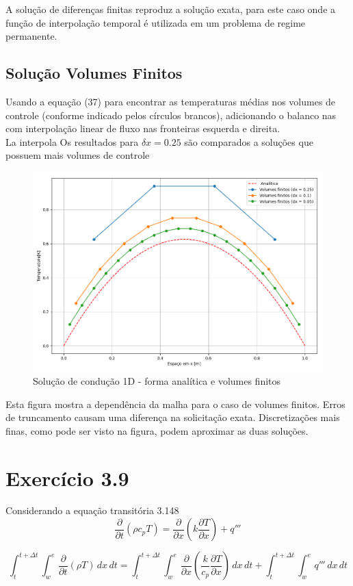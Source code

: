 \documentclass[]{article}
\begin{document}
A solução de diferenças finitas reproduz a solução exata, para este caso onde a função de interpolação temporal é utilizada em um problema de regime permanente.


\subsection*{Solução Volumes Finitos}

Usando a equação (37) para encontrar as temperaturas médias nos volumes de controle (conforme indicado pelos círculos brancos), adicionando o balanco nas com interpolação linear de fluxo nas fronteiras esquerda e direita.\\
La interpola
Os resultados para $\delta x = 0.25$ são comparados a soluções que possuem mais volumes de controle

\begin{figure}[H]
	\centering
	\includegraphics[width=.65\textwidth]{figures/38-3}
	\caption{Solução de condução 1D - forma analítica e volumes finitos}
\end{figure}

Esta figura mostra a dependência da malha para o caso de volumes finitos. Erros de truncamento causam uma diferença na solicitação exata. Discretizações mais finas, como pode ser visto na figura, podem aproximar as duas soluções.

\section*{Exercício 3.9}

Considerando a equação transitória 3.148
\begin{equation}
	\frac{\partial}{\partial t} \left( \rho c_p T \right) = \frac{\partial}{\partial x} \left( k \frac{\partial T}{\partial x} \right) + q'''
\end{equation}

\begin{equation}
	\int_t^{t+\Delta t} \int_w^e \frac{\partial}{\partial t} (\rho T) \, dx \, dt =
	\int_t^{t+\Delta t} \int_w^e \frac{\partial}{\partial x} \left( \frac{k}{c_p} \frac{\partial T}{\partial x} \right) \, dx \, dt +
	\int_t^{t+\Delta t} \int_w^e q''' \, dx \, dt
\end{equation}\\
\end{document}
